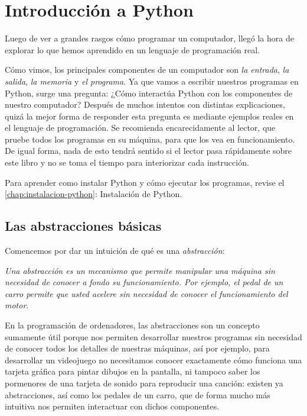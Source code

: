 \chapter{Introducción a Python}
\label{chap:python}

Luego de ver a grandes rasgos cómo programar un computador, llegó la hora de explorar lo que hemos aprendido en un lenguaje de programación real. 

Cómo vimos, los principales componentes de un computador son \emph{la entrada}, \emph{la salida}, \emph{la memoria} y \emph{el programa}. Ya que vamos a escribir nuestros programas en Python, surge una pregunta: ¿Cómo interactúa Python con los componentes de nuestro computador? Después de muchos intentos con distintas explicaciones, quizá la mejor forma de responder esta pregunta es mediante ejemplos reales en el lenguaje de programación. Se recomienda encarecidamente al lector, que pruebe todos los programas en su máquina, para que los vea en funcionamiento. De igual forma, nada de esto tendrá sentido si el lector pasa rápidamente sobre este libro y no se toma el tiempo para interiorizar cada instrucción.

Para aprender como instalar Python y cómo ejecutar los programas, revise el \autoref{chap:instalacion-python}: Instalación de Python.

\section{Las abstracciones básicas}

Comencemos por dar un intuición de qué es una \emph{abstracción}:

\emph{Una abstracción es un mecanismo que permite manipular una máquina sin necesidad de conocer a fondo su funcionamiento. Por ejemplo, el pedal de un carro permite que usted acelere sin necesidad de conocer el funcionamiento del motor}. 

En la programación de ordenadores, las abstracciones son un concepto sumamente útil porque nos permiten desarrollar nuestros programas sin necesidad de conocer todos los detalles de nuestras máquinas, así por ejemplo, para desarrollar un videojuego no necesitamos conocer exactamente cómo funciona una tarjeta gráfica para pintar dibujos en la pantalla, ni tampoco saber los pormenores de una tarjeta de sonido para reproducir una canción: existen ya abstracciones, así como los pedales de un carro, que de forma mucho más intuitiva nos permiten interactuar con dichos componentes.

